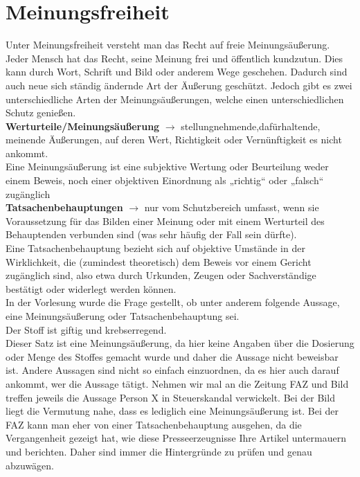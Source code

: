\section{Meinungsfreiheit}
Unter Meinungsfreiheit versteht man das Recht auf freie Meinungsäußerung. Jeder Mensch hat das Recht, seine Meinung frei und öffentlich kundzutun. Dies kann durch Wort, Schrift und Bild oder anderem Wege geschehen. Dadurch sind auch neue sich ständig ändernde Art der Äußerung geschützt. Jedoch gibt es zwei unterschiedliche Arten der Meinungsäußerungen, welche einen unterschiedlichen Schutz genießen.\\

\textbf{Werturteile/Meinungsäußerung} $\rightarrow$ stellungnehmende,dafürhaltende, meinende Äußerungen, auf deren Wert, Richtigkeit oder Vernünftigkeit es nicht ankommt. \\
Eine Meinungsäußerung ist eine subjektive Wertung oder Beurteilung weder einem Beweis, noch einer objektiven
Einordnung als „richtig“ oder „falsch“ zugänglich\\

\textbf{Tatsachenbehauptungen} $\rightarrow$ nur vom Schutzbereich umfasst, wenn sie Voraussetzung für das Bilden einer Meinung oder mit einem Werturteil des Behauptenden verbunden sind (was sehr häufig der Fall sein dürfte).\\
Eine Tatsachenbehauptung bezieht sich auf objektive Umstände in der Wirklichkeit, die (zumindest theoretisch) dem Beweis vor einem Gericht zugänglich sind, also etwa durch Urkunden, Zeugen oder Sachverständige bestätigt oder widerlegt werden können.\\

In der Vorlesung wurde die Frage gestellt, ob unter anderem folgende Aussage, eine Meinungsäußerung oder Tatsachenbehauptung sei. \\
\glqq{}Der Stoff ist giftig und krebserregend\grqq{}. \\
Dieser Satz ist eine Meinungsäußerung, da hier keine Angaben über die Dosierung oder Menge des Stoffes gemacht wurde und daher die Aussage nicht beweisbar ist. Andere Aussagen sind nicht so einfach einzuordnen, da es hier auch darauf ankommt, wer die Aussage tätigt. Nehmen wir mal an die Zeitung FAZ und Bild treffen jeweils die Aussage \glqq{}Person X in Steuerskandal verwickelt\grqq{}. Bei der Bild liegt die Vermutung nahe, dass es lediglich eine Meinungsäußerung ist. Bei der FAZ kann man eher von einer Tatsachenbehauptung ausgehen, da die Vergangenheit gezeigt hat, wie diese Presseerzeugnisse Ihre Artikel untermauern und berichten. Daher sind immer die Hintergründe zu prüfen und genau abzuwägen.\\

